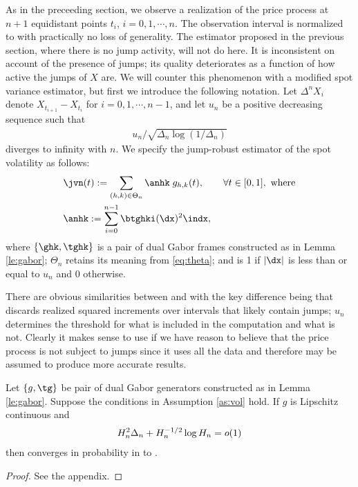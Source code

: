 \noindent As in the preceeding section, we observe a realization of the price process at $n + 1$ equidistant points $t_i$,  $i = 0, 1, \cdots, n$. The observation interval is normalized to \domain with practically no loss of generality.  The estimator proposed in the previous section, where there is no jump activity, will not do here. It is inconsistent on account of the presence of jumps; its quality deteriorates as a function of how active the jumps of $X$ are. We will counter this phenomenon with a modified spot variance estimator, but first we introduce the following notation. Let $\Delta^nX_i$ denote $X_{t_{i+1}} - X_{t_i}$ for $i = 0, 1,\cdots, n-1$, and let $u_n$  be a positive decreasing sequence such that 
\begin{align}
u_n/\sqrt{\Delta_n\log(1/\Delta_n)}  
  \label{}
\end{align}
 diverges to infinity with $n$. We specify the jump-robust estimator of the spot volatility as follows: 
\begin{align}
  &\jvn(t) := \sum_{(h,k) \in \Theta_n} \anhk\;g_{h,k}(t), \qquad \forall t \in [0,1], \text{ where}\\
  &\anhk := \sum_{i =0}^{n-1} \btghki (\dx)^2 \indx,
  \label{eq:jumpvolestimator}
\end{align}
where $\{\ghk, \tghk\}$ is a pair of dual Gabor frames constructed as in Lemma \eqref{le:gabor}; $\Theta_n$ retains its meaning from \eqref{eq:theta}; and \indx is 1 if $\vert\dx\vert$ is less than or equal to  $u_n$ and 0 otherwise.  

There are obvious similarities between \svn and \jvn with the key difference being that \jvn discards realized squared increments over intervals that likely contain jumps; $u_n$ determines the threshold for what is included in the computation and what is not. Clearly it makes sense to use \svn if we have reason to believe that the price process is not subject to jumps since it uses all the data and therefore may be assumed to produce more accurate results.  
\begin{prop} \label{pr:jconsistency}
  Let $\{g, \tg\}$ be pair of dual Gabor generators constructed as in Lemma \eqref{le:gabor}.   Suppose the conditions in  Assumption \eqref{as:vol}  hold. If $g$ is Lipschitz continuous and  
  \begin{align}
    H_n^2 \Delta_n  + H_n^{-1/2} \log H_n= o(1) \notag
    \label{}
  \end{align}
  then  \jvn converges in probability in \Ltwo to \sv.
\end{prop}
\begin{proof} See the appendix.
\end{proof}
